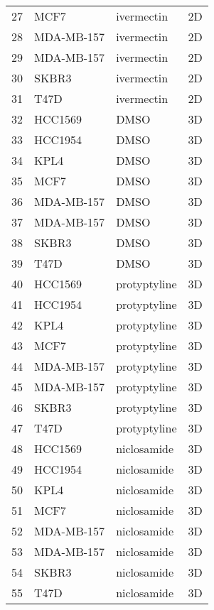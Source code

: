 \begin{tabular}{llll}
27 &        MCF7 &    ivermectin &          2D \\
28 &  MDA-MB-157 &    ivermectin &          2D \\
29 &  MDA-MB-157 &    ivermectin &          2D \\
30 &       SKBR3 &    ivermectin &          2D \\
31 &        T47D &    ivermectin &          2D \\
32 &     HCC1569 &          DMSO &          3D \\
33 &     HCC1954 &          DMSO &          3D \\
34 &        KPL4 &          DMSO &          3D \\
35 &        MCF7 &          DMSO &          3D \\
36 &  MDA-MB-157 &          DMSO &          3D \\
37 &  MDA-MB-157 &          DMSO &          3D \\
38 &       SKBR3 &          DMSO &          3D \\
39 &        T47D &          DMSO &          3D \\
40 &     HCC1569 &  protyptyline &          3D \\
41 &     HCC1954 &  protyptyline &          3D \\
42 &        KPL4 &  protyptyline &          3D \\
43 &        MCF7 &  protyptyline &          3D \\
44 &  MDA-MB-157 &  protyptyline &          3D \\
45 &  MDA-MB-157 &  protyptyline &          3D \\
46 &       SKBR3 &  protyptyline &          3D \\
47 &        T47D &  protyptyline &          3D \\
48 &     HCC1569 &   niclosamide &          3D \\
49 &     HCC1954 &   niclosamide &          3D \\
50 &        KPL4 &   niclosamide &          3D \\
51 &        MCF7 &   niclosamide &          3D \\
52 &  MDA-MB-157 &   niclosamide &          3D \\
53 &  MDA-MB-157 &   niclosamide &          3D \\
54 &       SKBR3 &   niclosamide &          3D \\
55 &        T47D &   niclosamide &          3D \\

\end{tabular}
